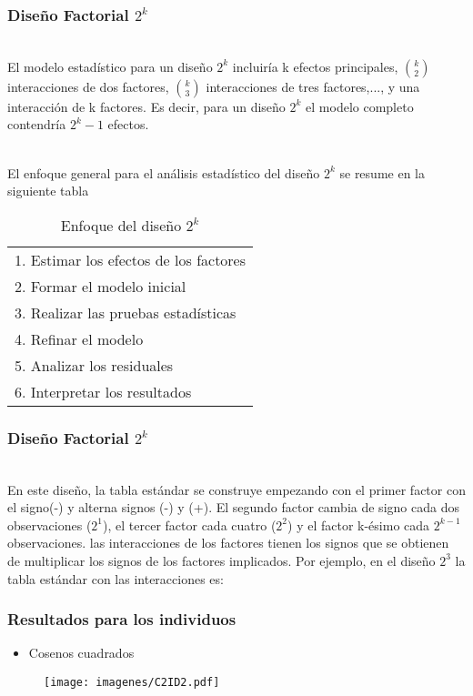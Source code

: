 \documentclass[12pt]{beamer}
\begin{document}
\begin{frame}
\frametitle{Diseño Factorial $ 2^{k} $}
~\\El modelo estadístico para un diseño $2^k$ incluiría k efectos principales, $\binom{k}{2}$ interacciones de dos factores, $\binom{k}{3}$ interacciones de tres factores,..., y una interacción de k factores. Es decir, para un diseño $2^k$ el modelo completo contendría $2^k-1$ efectos.

~\\El enfoque general para el análisis estadístico del diseño $2^k$ se resume en la siguiente tabla
\begin{table}[htbp]
  \centering
  \caption{Enfoque del diseño  $ 2^{k} $}
  \resizebox{4.7cm}{!} {
\begin{tabular}{l}
\hline 
1. Estimar los efectos de los factores\\
2. Formar el modelo inicial\\
3. Realizar las pruebas estadísticas\\
4. Refinar el modelo\\
5. Analizar los residuales\\
6. Interpretar los resultados\\
\hline 
\end{tabular}
}
\label{tab:addlabel}%
\end{table}%
\end{frame}

\begin{frame}
\frametitle{Diseño Factorial $ 2^{k} $}
~\\En este diseño, la tabla estándar se construye empezando con el primer factor con el signo(-) y alterna signos (-) y (+). El segundo factor cambia de signo cada dos observaciones ($2^1$), el tercer factor cada cuatro ($2^2$) y el factor k-ésimo cada $2^{k-1}$ observaciones. las interacciones de los factores tienen los signos que se obtienen de multiplicar los signos de los factores implicados. Por ejemplo, en el diseño $2^3$ la tabla estándar con las interacciones es:
\end{frame}

\begin{frame}
\frametitle{Resultados para los individuos}
\begin{itemize}
\item Cosenos cuadrados
\end{itemize}
\begin{figure}[h]
  \centering
  \texttt{[image: imagenes/C2ID2.pdf]}
\end{figure}
\end{frame}
\end{document}
